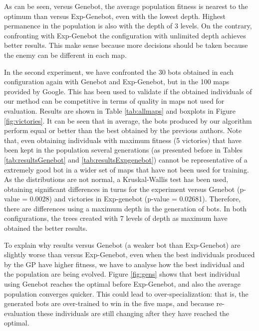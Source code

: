 As can be seen, versus Genebot, the average population fitness is nearest to the optimum than versus Exp-Genebot, even with the lowest depth. Highest permanence in the population is also with the depth of 3 levels. On the contrary, confronting with Exp-Genebot the configuration with unlimited depth achieves better results. This make sense because more decisions should be taken because the enemy can be different in each map.

In the second experiment, we have confronted the 30 bots obtained in each configuration again with Genebot and Exp-Genebot, but in the 100 maps provided by Google. This has been used to validate if the obtained individuals of our method can be competitive in terms of quality in maps not used for evaluation. Results are shown in Table \ref{tab:allmaps} and boxplots in Figure \ref{fig:victories}. It can be seen that in average, the bots produced by our algorithm perform equal or better than the best obtained by the previous authors. Note that, even obtaining individuals with maximum fitness (5 victories) that have been kept in the population several generations (as presented 
before in Tables \ref{tab:resultsGenebot} and \ref{tab:resultsExpgenebot}) cannot be representative of a extremely good bot in a wider set of maps that have not been used for training. As the distributions are not normal, a Kruskal-Wallis test has been used, obtaining significant differences in turns for the experiment versus Genebot (p-value = 0.0028) and victories in Exp-genebot (p-value = 0.02681). Therefore, there are differences using a maximum depth in the generation of bots. In both configurations, the trees created with 7 levels of depth as maximum have obtained the better results.

To explain why results versus Genebot (a weaker bot than Exp-Genebot) are slightly worse than versus Exp-Genebot, even when the best individuals produced by the GP have higher fitness, we have to analyse how the best individual and the population are being evolved. Figure \ref{fig:gens} shows that best individual using Genebot reaches the optimal before Exp-Genebot, and also the average population converges quicker. This could lead to over-specialization: that is, the generated bots are over-trained to win in the five maps, and because re-evaluation these individuals are still changing after they have reached the optimal.



